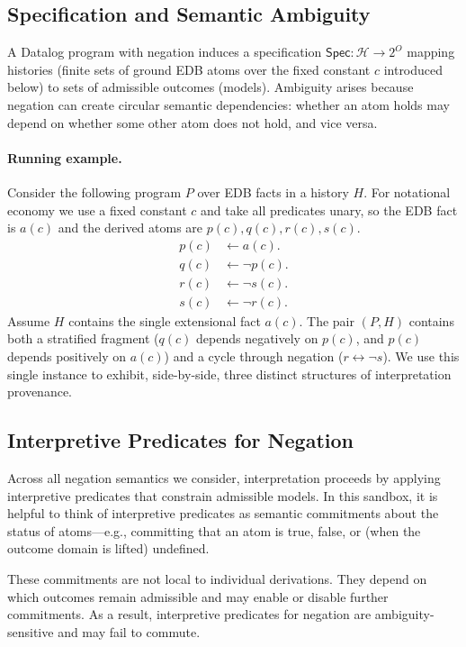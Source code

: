 \documentclass[acmsmall,nonacm]{acmart}
\theoremstyle{remark}
\numberwithin{definition}{section}
\numberwithin{theorem}{section}
\numberwithin{lemma}{section}
\numberwithin{corollary}{section}
\numberwithin{remark}{section}
\numberwithin{example}{section}
\numberwithin{observation}{section}
\numberwithin{assumption}{section}
\newcommand{\Hist}{\mathcal{H}}
\newcommand{\Spec}{\mathsf{Spec}}
\begin{document}
\subsection{Specification and Semantic Ambiguity}

A Datalog program with negation induces a specification
$\Spec : \Hist \to 2^{O}$ mapping histories (finite sets of ground EDB atoms over the fixed constant $c$ introduced below) to sets of admissible
outcomes (models).
Ambiguity arises because negation can create circular semantic dependencies:
whether an atom holds may depend on whether some other atom does not hold, and
vice versa.

\paragraph{Running example.}
Consider the following program $P$ over EDB facts in a history $H$.
For notational economy we use a fixed constant $c$ and take all predicates unary, so the EDB fact is $a(c)$ and the derived atoms are $p(c),q(c),r(c),s(c)$.
\begin{align*}
  p(c) &\leftarrow a(c).\\
  q(c) &\leftarrow \neg p(c).\\[1mm]
  r(c) &\leftarrow \neg s(c).\\
  s(c) &\leftarrow \neg r(c).
\end{align*}
Assume $H$ contains the single extensional fact $a(c)$.
The pair $(P,H)$ contains both a stratified fragment
($q(c)$ depends negatively on $p(c)$, and $p(c)$ depends positively on $a(c)$)
and a cycle through negation ($r \leftrightarrow \neg s$).
We use this single instance to exhibit, side-by-side, three distinct structures
of interpretation provenance.

\subsection{Interpretive Predicates for Negation}

Across all negation semantics we consider, interpretation proceeds by applying
interpretive predicates that constrain admissible models.
In this sandbox, it is helpful to think of interpretive predicates as semantic
commitments about the status of atoms---e.g., committing that an atom is true,
false, or (when the outcome domain is lifted) undefined.

These commitments are not local to individual derivations.
They depend on which outcomes remain admissible and may enable or disable further
commitments.
As a result, interpretive predicates for negation are ambiguity-sensitive and may
fail to commute.
\end{document}
